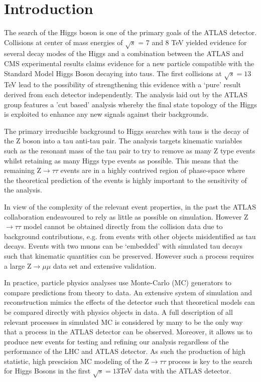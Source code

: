 \section{Introduction}
\label{sec:intro}

The search of the Higgs boson is one of the primary goals of the ATLAS detector. Collisions at center of mass energies of $\sqrt{s}$ = 7 and 8 TeV yielded evidence for several decay modes of the Higgs and a combination between the ATLAS and CMS experimental results claims evidence for a new particle compatible with the Standard Model Higgs Boson decaying into taus. The first collisions at $\sqrt{s}=13$ TeV lead to the possibility of strengthening this evidence with a `pure' result derived from each detector independently. The analysis laid out by the ATLAS group features a 'cut based' analysis whereby the final state topology of the Higgs is exploited to enhance any new signals against their backgrounds. 

The primary irreducible background to Higgs searches with taus is the decay of the Z boson into a tau anti-tau pair. The analysis targets kinematic variables such as the resonant mass of the tau pair to try to remove as many Z type events whilst retaining as many Higgs type events as possible. This means that the remaining Z$\rightarrow\tau\tau$ events are in a highly contrived region of phase-space where the theoretical prediction of the events is highly important to the sensitivity of the analysis. 

In view of the complexity of the
relevant event properties, in the past the ATLAS collaboration endeavoured to rely as little as possible on simulation. However Z$\rightarrow\tau\tau$ model cannot be obtained directly from the collision data due to background contributions, e.g.  from events with other objects misidentified as tau decays. Events with two muons can be `embedded' with simulated tau decays such that kinematic quantities can be preserved. However such a process requires a large Z$\rightarrow\mu\mu$ data set and extensive validation.

In practice, particle physics analyses use Monte-Carlo (MC) generators to compare predictions from theory to data. An extensive system of simulation and reconstruction mimics the effects of the detector such that theoretical models can be compared directly with physics objects in data. A full description of all relevant processes in simulated MC is considered by many to be the only way that a process in the ATLAS detector can be observed. Moreover, it allows us to produce new events for testing and refining our analysis regardless of the performance of the LHC and ATLAS detector. As such the production of high statistic, high prescision MC modeling of the Z$\rightarrow\tau\tau$ process is key to the search for Higgs Bosons in the first $\sqrt{s}=13$TeV data with the ATLAS detector.

